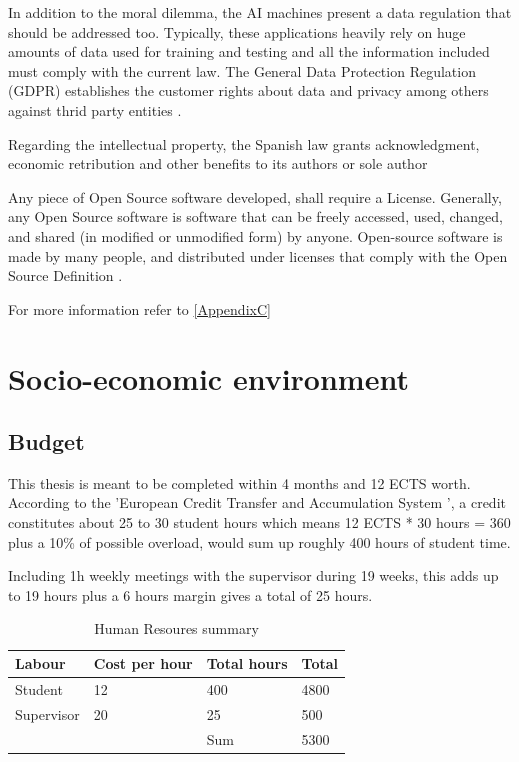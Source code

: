 In addition to the moral dilemma, the AI machines present a data regulation that should be addressed too.
Typically, these applications heavily rely on huge amounts of data used for training and testing and all the information included must comply with the current law.
The General Data Protection Regulation (GDPR) establishes the customer rights about data and privacy among others against thrid party entities \cite{InformationCommissionersOffice2018}.


Regarding the intellectual property, the Spanish law grants acknowledgment, economic retribution and other benefits to its authors or sole author \cite{OrganizacionMundialdelaPropiedadIntelectual-OMPI-2016}


Any piece of Open Source software developed, shall require a License.
Generally, any Open Source software is software that can be freely accessed, used, changed, and shared (in modified or unmodified form) by anyone. 
Open-source software is made by many people, and distributed under licenses that comply with the Open Source Definition \cite{opensource} \cite{opensourcedef}.

For more information refer to \ref{AppendixC}


\newpage

\section{Socio-economic environment}
\subsection{Budget}

This thesis is meant to be completed within 4 months and 12 ECTS worth. 
According to the 'European Credit Transfer and Accumulation System \cite{EuropeanCommission2009}', 
a credit constitutes about 25 to 30 student hours which means 12 ECTS * 30 hours = 360 plus a 10\% of possible overload, would sum up roughly 400 hours of student time.

Including 1h weekly meetings with the supervisor during 19 weeks, this adds up to 19 hours plus a 6 hours margin gives a total of 25 hours.

\begin{table}[h!]
    \centering
    \begin{tabular}{l l l l} 
        \hline
        Labour & Cost per hour & Total hours & Total \\ [0.5ex] 
        \hline
        Student & 12 & 400 & 4800 \\ 
        Supervisor & 20 & 25 & 500 \\
        \hline
        & & Sum & 5300 \\
        \hline
    \end{tabular}
    \caption{Human Resoures summary}
    \label{table:Human Resoures summary}
\end{table}

